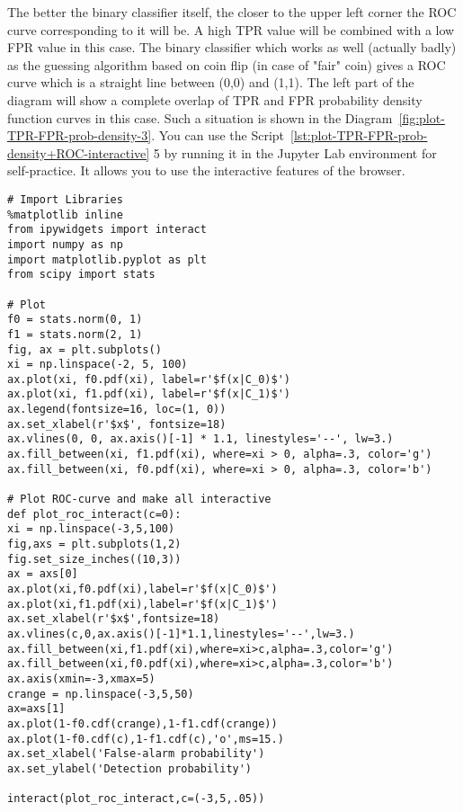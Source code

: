 \documentclass[]{scrreprt}
\begin{document}
The better the binary classifier itself, the closer to the upper left corner the ROC curve corresponding to it will be. A high TPR value will be combined with a low FPR value in this case. The binary classifier which works as well (actually badly) as the guessing algorithm based on coin flip  (in case of "fair" coin) gives a ROC curve which is a straight line between (0,0) and (1,1). The left part of the diagram will show a complete overlap of TPR and FPR probability density function curves in this case. Such a situation is shown in the Diagram~\ref{fig:plot-TPR-FPR-prob-density-3}. You can use the Script~\ref{lst:plot-TPR-FPR-prob-density+ROC-interactive} 5 by running it in the Jupyter Lab environment for self-practice. It allows you to use the interactive features of the browser.
%
\begin{lstlisting}[float=htp, caption = Build an~interactive graph of~TPR and FPR distribution density and its corresponding ROC curve for a given threshold value, firstnumber=1, label= lst:plot-TPR-FPR-prob-density+ROC-interactive]
# Import Libraries
%matplotlib inline
from ipywidgets import interact
import numpy as np
import matplotlib.pyplot as plt
from scipy import stats

# Plot
f0 = stats.norm(0, 1)
f1 = stats.norm(2, 1)
fig, ax = plt.subplots()
xi = np.linspace(-2, 5, 100)
ax.plot(xi, f0.pdf(xi), label=r'$f(x|C_0)$')
ax.plot(xi, f1.pdf(xi), label=r'$f(x|C_1)$')
ax.legend(fontsize=16, loc=(1, 0))
ax.set_xlabel(r'$x$', fontsize=18)
ax.vlines(0, 0, ax.axis()[-1] * 1.1, linestyles='--', lw=3.)
ax.fill_between(xi, f1.pdf(xi), where=xi > 0, alpha=.3, color='g')
ax.fill_between(xi, f0.pdf(xi), where=xi > 0, alpha=.3, color='b')

# Plot ROC-curve and make all interactive
def plot_roc_interact(c=0):
xi = np.linspace(-3,5,100)
fig,axs = plt.subplots(1,2)
fig.set_size_inches((10,3))
ax = axs[0]
ax.plot(xi,f0.pdf(xi),label=r'$f(x|C_0)$')
ax.plot(xi,f1.pdf(xi),label=r'$f(x|C_1)$')
ax.set_xlabel(r'$x$',fontsize=18)
ax.vlines(c,0,ax.axis()[-1]*1.1,linestyles='--',lw=3.)
ax.fill_between(xi,f1.pdf(xi),where=xi>c,alpha=.3,color='g')
ax.fill_between(xi,f0.pdf(xi),where=xi>c,alpha=.3,color='b')
ax.axis(xmin=-3,xmax=5)
crange = np.linspace(-3,5,50)
ax=axs[1]
ax.plot(1-f0.cdf(crange),1-f1.cdf(crange))
ax.plot(1-f0.cdf(c),1-f1.cdf(c),'o',ms=15.)
ax.set_xlabel('False-alarm probability')
ax.set_ylabel('Detection probability')

interact(plot_roc_interact,c=(-3,5,.05))

\end{lstlisting}
\end{document}
